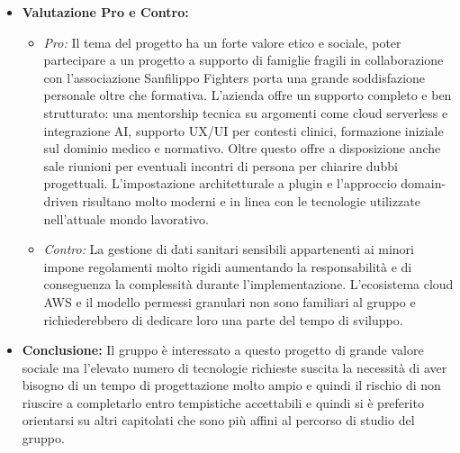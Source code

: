 \documentclass[12pt,a4paper]{article}
\newcommand{\tightlist}{\setlength{\itemsep}{1pt}\setlength{\parskip}{0pt}}
\begin{document}
\begin{itemize}
\item \textbf{Valutazione Pro e Contro:}
  \begin{itemize}
  \tightlist
  \item \emph{Pro:} Il tema del progetto ha un forte valore etico e sociale, poter partecipare a un progetto a supporto di famiglie fragili in collaborazione con l’associazione Sanfilippo Fighters porta una grande soddisfazione personale oltre che formativa.
L’azienda offre un supporto completo e ben strutturato:
una mentorship tecnica su argomenti come cloud serverless e integrazione AI, supporto UX/UI per contesti clinici, formazione iniziale sul dominio medico e normativo.
Oltre questo offre a disposizione anche sale riunioni per eventuali incontri di persona per chiarire dubbi progettuali.
L’impostazione architetturale a plugin e l’approccio domain-driven risultano molto moderni e in linea con le tecnologie utilizzate nell’attuale mondo lavorativo.

  \item \emph{Contro:} La gestione di dati sanitari sensibili appartenenti ai minori impone regolamenti molto rigidi aumentando la responsabilità e di conseguenza la complessità durante l’implementazione.
L’ecosistema cloud AWS e il modello permessi granulari non sono familiari al gruppo e richiederebbero di dedicare loro una parte del tempo di sviluppo.

  \end{itemize}
\item \textbf{Conclusione:} Il gruppo è interessato a questo progetto di grande valore sociale ma l’elevato numero di tecnologie richieste suscita la necessità di aver bisogno di un tempo di progettazione molto ampio e quindi il rischio di non riuscire a completarlo entro tempistiche accettabili e quindi si è preferito orientarsi su altri capitolati che sono più affini al percorso di studio del gruppo.
\end{itemize}
\end{document}
